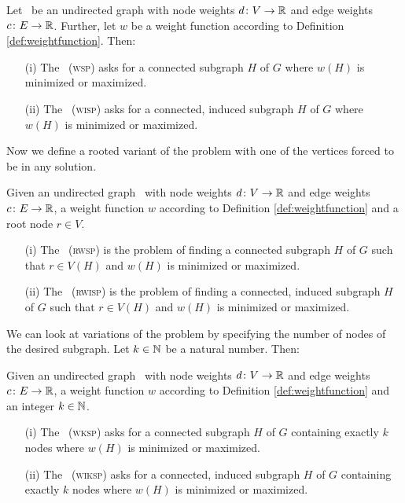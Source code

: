 \begin{definition}
	\label{def:wsp}
	Let \ugraph\ be an undirected graph with node weights $d\colon V \to \mathbb{R}$ and edge weights $c\colon E \to \mathbb{R}$. Further, let $w$ be a weight function according to Definition \ref{def:weightfunction}.
	Then:
	\begin{itemize}
		\item[(i)] The \WSP\ (\textsc{wsp}) asks for a connected subgraph $H$ of $G$ where $w(H)$ is minimized or maximized.
		\item[(ii)] The \WISP\ (\textsc{wisp}) asks for a connected, induced subgraph $H$ of $G$ where $w(H)$ is minimized or maximized.
	\end{itemize}
\end{definition}

Now we define a rooted variant of the problem with one of the vertices forced to be in any solution.

\begin{definition}
	\label{def:rwsp}
	Given an undirected graph \ugraph\ with node weights $d\colon V \to \mathbb{R}$ and edge weights $c\colon E \to \mathbb{R}$, a weight function $w$ according to Definition \ref{def:weightfunction} and a root node $r \in V$.
	\begin{itemize}
		\item[(i)] The \RWSP\ (\textsc{rwsp}) is the problem of finding a connected subgraph $H$ of $G$ such that $r \in V(H)$ and $w(H)$ is minimized or maximized.
		\item[(ii)] The \RWISP\ (\textsc{rwisp}) is the problem of finding a connected, induced subgraph $H$ of $G$ such that $r \in V(H)$ and $w(H)$ is minimized or maximized.
	\end{itemize}
\end{definition}

We can look at variations of the problem by specifying the number of nodes of the desired subgraph. Let $k \in \mathbb{N}$ be a natural number. Then:

\begin{definition}
	\label{def:wksp}
	Given an undirected graph \ugraph\ with node weights $d\colon V \to \mathbb{R}$ and edge weights $c\colon E \to \mathbb{R}$, a weight function $w$ according to Definition \ref{def:weightfunction} and an integer $k \in \mathbb{N}$.
	\begin{itemize}
		\item[(i)] The \WkSP\ (\textsc{wksp}) asks for a connected subgraph $H$ of $G$ containing exactly $k$ nodes where $w(H)$ is minimized or maximized.
		\item[(ii)] The \WIkSP\ (\textsc{wiksp}) asks for a connected, induced subgraph $H$ of $G$ containing exactly $k$ nodes where $w(H)$ is minimized or maximized.
	\end{itemize}
\end{definition}

